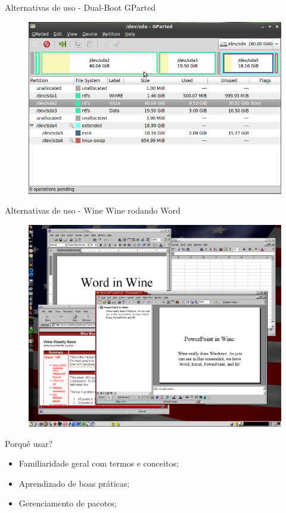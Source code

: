 \documentclass[size=14pt,
style=paintings
]{powerdot}
\newenvironment{vslide}{\vspace{\stretch{1}}}{\vspace{\stretch{1}}}
\begin{document}
\begin{slide}{Alternativas de uso - Dual-Boot}
GParted
	\centering
	\begin{figure}[!h]
		\includegraphics[scale=0.50]{imagens/slide/dualBootGparted}
	\end{figure}
\end{slide}
\begin{slide}{Alternativas de uso - Wine}
Wine rodando Word
	\centering
	\begin{figure}[!h]
		\includegraphics[scale=0.25]{imagens/slide/wineWord}
	\end{figure}
\end{slide}

\begin{slide}{Porquê usar?}
\begin{vslide}
\begin{itemize}
\setlength{\itemsep}{0.5cm}
\item	Familiaridade geral com termos e conceitos;
\item	Aprendizado de boas práticas;
\item	Gerenciamento de pacotes;
\end{itemize}
\end{vslide}
\end{slide}
\end{document}
